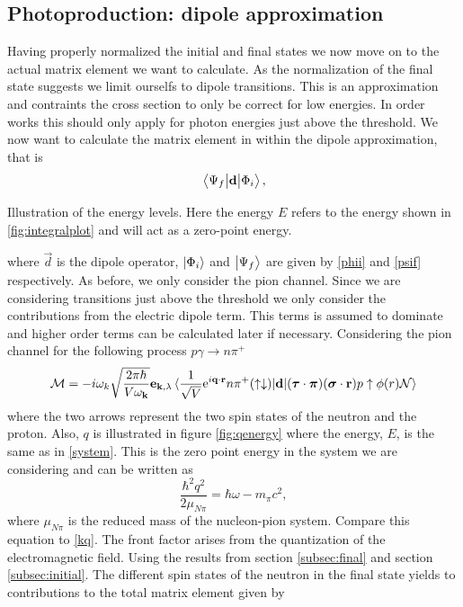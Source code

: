 \subsection{Photoproduction: dipole approximation}\label{sec:dipoles}
Having properly normalized the initial and final states we now move on to the actual matrix element we want to calculate. As the normalization of the final state suggests we limit ourselfs to dipole transitions. This is an approximation and contraints the cross section to only be correct for low energies. In order works this should only apply for photon energies just above the threshold. We now want to calculate the matrix element in within the dipole approximation, that is
\begin{equation}
    \mel{\Psi_f}{\bm{\mathrm{d}}}{\Phi_i},
\end{equation}
\begin{marginfigure}
\centering

\caption{Illustration of the energy levels. Here the energy $E$ refers to the energy shown in \ref{fig:integralplot} and will act as a zero-point energy.}
\label{fig:qenergy}
\end{marginfigure}  
where $\vec{d}$ is the dipole operator, $\ket{\Phi_i}$ and $\ket{\Psi_f}$ are given by \eqref{phii} and \eqref{psif} respectively. As before, we only consider the pion channel. Since we are considering transitions just above the threshold we only consider the contributions from the electric dipole term. This terms is assumed to dominate and higher order terms can be calculated later if necessary. Considering the pion channel for the following process $p \gamma \rightarrow n\pi^+$
\begin{equation}
    \mathcal{M}=-i\omega_k\sqrt{\frac{2\pi\hbar}{V\omega_{\bm{\mathrm{k}}}}}\bm{\mathrm{e}}_{\bm{\mathrm{k}},\lambda}\mel*{\frac{1}{\sqrt{V}}\text{e}^{i\bm{\mathrm{q}}\cdot \bm{\mathrm{r}}}n\pi^+ (\uparrow \downarrow)}{\bm{\mathrm{d}}}{(\bm{\mathrm{\tau}}\cdot \bm{\mathrm{\pi}})(\bm{\mathrm{\sigma}}\cdot \bm{\mathrm{r}})p\uparrow \phi(r)\mathcal{N}}
\end{equation}
where the two arrows represent the two spin states of the neutron and the proton. Also, $q$ is illustrated in figure \ref{fig:qenergy} where the energy, $E$, is the same as in \eqref{system}. This is the zero point energy in the system we are considering and can be written as 
\begin{equation}
    \frac{\hbar^2 q^2}{2\mu_{N\pi}} = \hbar \omega-m_\pi c^2,
\end{equation}
where $\mu_{N\pi}$ is the reduced mass of the nucleon-pion system. Compare this equation to \eqref{kq}. The front factor arises from the quantization of the electromagnetic field. Using the results from section \ref{subsec:final} and section \ref{subsec:initial}. The different spin states of the neutron in the final state yields to contributions to the total matrix element given by
